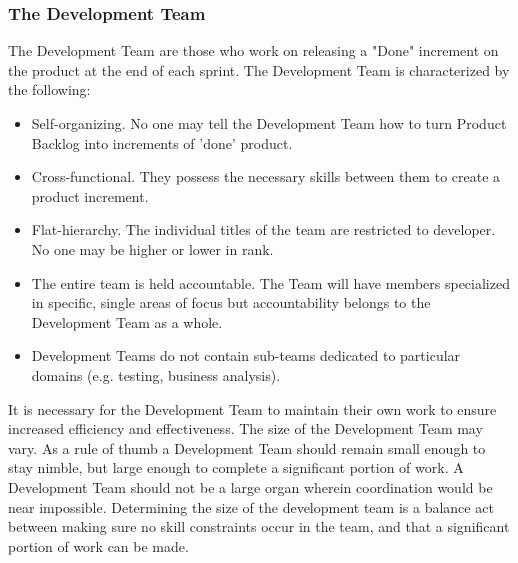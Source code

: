 \subsubsection{The Development Team}


The Development Team are those who work on releasing a "Done" increment on the product at the end of each sprint\cite{scrumguide11}. The Development Team is characterized by the following:


\begin{itemize}
	\item Self-organizing. No one may tell the Development Team how to turn Product Backlog into increments of 'done' product.
	\item	Cross-functional. They possess the necessary skills between them to create a product increment.
	\item	Flat-hierarchy. The individual titles of the team are restricted to developer. No one may be higher or lower in rank.
	\item	The entire team is held accountable. The Team will have members specialized in specific, single areas of focus but accountability belongs to the Development Team as a whole.
	\item	Development Teams do not contain sub-teams dedicated to particular domains (e.g. testing, business analysis).
\end{itemize}


It is necessary for the Development Team to maintain their own work to ensure increased efficiency and effectiveness\cite{scrumguide11}.
The size of the Development Team may vary. As a rule of thumb a Development Team should remain small enough to stay nimble, but large enough to complete a significant portion of work\cite{scrumguide11}. A Development Team should not be a large organ wherein coordination would be near impossible\cite{scrumguide11}. Determining the size of the development team is a balance act between making sure no skill constraints occur in the team, and that a significant portion of work can be made\cite{scrumguide11}.